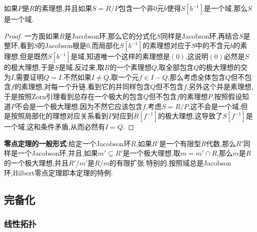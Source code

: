 如果$P$是$R$的素理想,并且如果$S=R/P$包含一个非0元$b$使得$S[b^{-1}]$是一个域,那么$S$是一个域.
\begin{proof}
	
	一方面如果$R$是Jacobson环,那么它的分式化$S$同样是Jacobson环,再结合$S$是整环,看到$S$的Jacobson根是0.而局部化$S[b^ {-1}]$的素理想对应于$S$中的不含元$b$的素理想,但是既然$S[b^{-1}]$是域,知道唯一个这样的素理想是$(0)$,这说明$(0)$必然是$S$的极大理想,于是$S$是域.反过来,取$R$的一个素理想$Q$,取全部包含$Q$的极大理想的交为$I$,需要证明$Q=I$.不然如果$I\not=Q$,取一个元$f\in I-Q$,那么考虑全体包含$Q$但不包含$f$的素理想,对每一个升链,看到它的并同样包含$Q$但不包含$f$,另外这个并是素理想,于是按照Zorn引理看到总存在一个极大的包含$Q$但不包含$f$的素理想$P$,按照假设知道$P$不会是一个极大理想,因为不然它应该包含$f$,考虑$S=R/P$,这不会是一个域,但是按照局部化的理想对应关系看到$P$对应到$R[f^ {-1}]$的极大理想,这导致了$S[f^{-1}]$是一个域,这和条件矛盾,从而必然有$I=Q$.
\end{proof}

\textbf{零点定理的一般形式}:给定一个Jacobson环$R$,如果$R'$是一个有限型$R$代数,那么$R'$同样是一个Jacobson环,并且,如果$m'\subseteq R'$是一个极大理想,取$m=m'\cap R$,那么$m$是$R$的一个极大理想,并且$R'/m'$是$R/m$的有限扩张.特别的,按照域总是Jacobson环,Hilbert零点定理即本定理的特例.
\newpage
\subsection{完备化}
\subsubsection{线性拓扑}

